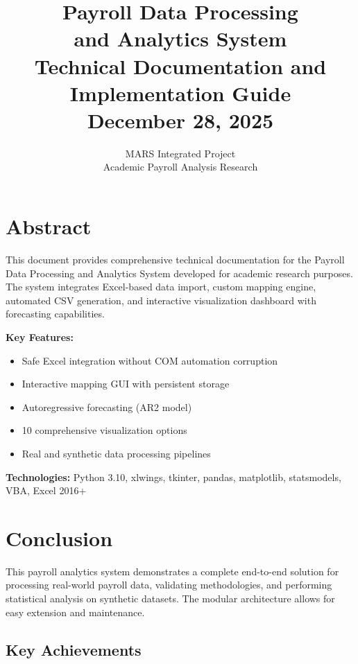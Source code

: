 \documentclass[12pt,a4paper]{report}
\title{
    \vspace{2cm}
    \Huge\textbf{Payroll Data Processing \\ and Analytics System}\\
    \vspace{1cm}
    \Large Technical Documentation and Implementation Guide\\
    \vspace{1cm}
    \large December 28, 2025
}
\author{
    \Large MARS Integrated Project\\
    \vspace{0.5cm}
    \normalsize Academic Payroll Analysis Research
}
\date{}
\begin{document}
\maketitle

\chapter*{Abstract}

This document provides comprehensive technical documentation for the Payroll Data Processing and Analytics System developed for academic research purposes. The system integrates Excel-based data import, custom mapping engine, automated CSV generation, and interactive visualization dashboard with forecasting capabilities.

\textbf{Key Features:}
\begin{itemize}
    \item Safe Excel integration without COM automation corruption
    \item Interactive mapping GUI with persistent storage
    \item Autoregressive forecasting (AR2 model)
    \item 10 comprehensive visualization options
    \item Real and synthetic data processing pipelines
\end{itemize}

\textbf{Technologies:} Python 3.10, xlwings, tkinter, pandas, matplotlib, statsmodels, VBA, Excel 2016+

\tableofcontents











\chapter*{Conclusion}

This payroll analytics system demonstrates a complete end-to-end solution for processing real-world payroll data, validating methodologies, and performing statistical analysis on synthetic datasets. The modular architecture allows for easy extension and maintenance.

\section*{Key Achievements}
\end{document}
